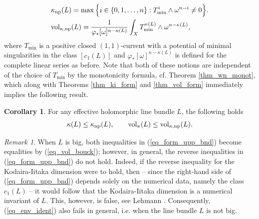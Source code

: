 \documentclass[12pt]{article}
\numberwithin{equation}{section}
\theoremstyle{theorem}
\theoremstyle{definition}
\newtheorem{cor}[thm]{Corollary}
\theoremstyle{remark}
\newtheorem{rem}[thm]{Remark}
\begin{document}
	\begin{equation}\label{eq_numerical_defn}
	\begin{aligned}
		&
		\kappa_{{\rm{np}}}(L) = \max\Big\{
			i \in \{ 0, 1, \ldots, n \} :  T_{\min}^{i} \wedge \omega^{n - i} \neq 0
		\Big\}.
		\\
		&
		{\rm{vol}}_{\kappa, {\rm{np}}}(L)
		=
		\frac{1}{\varphi_{*} [\omega]^{n - \kappa(L)}} \int_X T_{\min}^{\kappa(L)} \wedge \omega^{n - \kappa(L)},
	\end{aligned}
	\end{equation}
	where $T_{\min}$ is a positive closed $(1, 1)$-current with a potential of minimal singularities in the class $[c_1(L)]$ and $\varphi_{*} [\omega]^{n - \kappa(L)}$ is defined for the complete linear series as before.
	Note that both of these notions are independent of the choice of $T_{\min}$ by the monotonicity formula, cf. Theorem \ref{thm_wn_monot}, which along with Theorems \ref{thm_ki_form} and \ref{thm_vol_form} immediately implies the following result.
	\begin{cor}
		For any effective holomorphic line bundle $L$, the following holds
		\begin{equation}\label{eq_form_upp_bnd}
			\kappa(L) \leq \kappa_{{\rm{np}}}(L), \qquad {\rm{vol}}_{\kappa}(L) \leq {\rm{vol}}_{\kappa, {\rm{np}}}(L).
		\end{equation}
	\end{cor}
	\begin{rem}
		When $L$ is big, both inequalities in (\ref{eq_form_upp_bnd}) become equalities by (\ref{eq_vol_bouck}); however, in general, the reverse inequalities in (\ref{eq_form_upp_bnd}) do not hold.
		Indeed, if the reverse inequality for the Kodaira-Iitaka dimension were to hold, then -- since the right-hand side of (\ref{eq_form_upp_bnd}) depends solely on the numerical data, namely the class $c_1(L)$ -- it would follow that the Kodaira-Iitaka dimension is a numerical invariant of $L$. 
		This, however, is false, see Lehmann \cite[Example 6.1]{LehmannIitaka}.
		Consequently, (\ref{eq_env_ident}) also fails in general, i.e. when the line bundle $L$ is not big.
	\end{rem}
	\par
\end{document}
